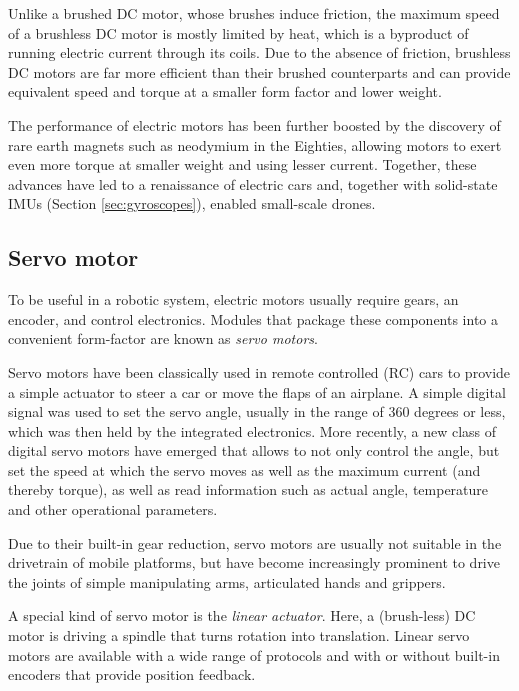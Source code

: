 Unlike a brushed DC motor, whose brushes induce friction, the maximum speed of a brushless DC motor is mostly limited by heat, which is a byproduct of running electric current through its coils. Due to the absence of friction, brushless DC motors are far more efficient than their brushed counterparts and can provide equivalent speed and torque at a smaller form factor and lower weight.

The performance of electric motors has been further boosted by the discovery of rare earth magnets such as neodymium in the Eighties, allowing motors to exert even more torque at smaller weight and using lesser current. Together, these advances have led to a renaissance of electric cars and, together with solid-state IMUs (Section \ref{sec:gyroscopes}), enabled small-scale drones.

\subsection{Servo motor}

To be useful in a robotic system, electric motors usually require gears, an encoder, and control electronics. Modules that package these components into a convenient form-factor are known as \textsl{servo motors}.

Servo motors have been classically used in remote controlled (RC) cars to provide a simple actuator to steer a car or move the flaps of an airplane. A simple digital signal was used to set the servo angle, usually in the range of 360 degrees or less, which was then held by the integrated electronics. More recently, a new class of digital servo motors have emerged that allows to not only control the angle, but set the speed at which the servo moves as well as the maximum current (and thereby torque), as well as read information such as actual angle, temperature and other operational parameters.

Due to their built-in gear reduction, servo motors are usually not suitable in the drivetrain of mobile platforms, but have become increasingly prominent to drive the joints of simple manipulating arms, articulated hands and grippers.

A special kind of servo motor is the \textsl{linear actuator}. Here, a (brush-less) DC motor is driving a spindle that turns rotation into translation. Linear servo motors are available with a wide range of protocols and with or without built-in encoders that provide position feedback.

